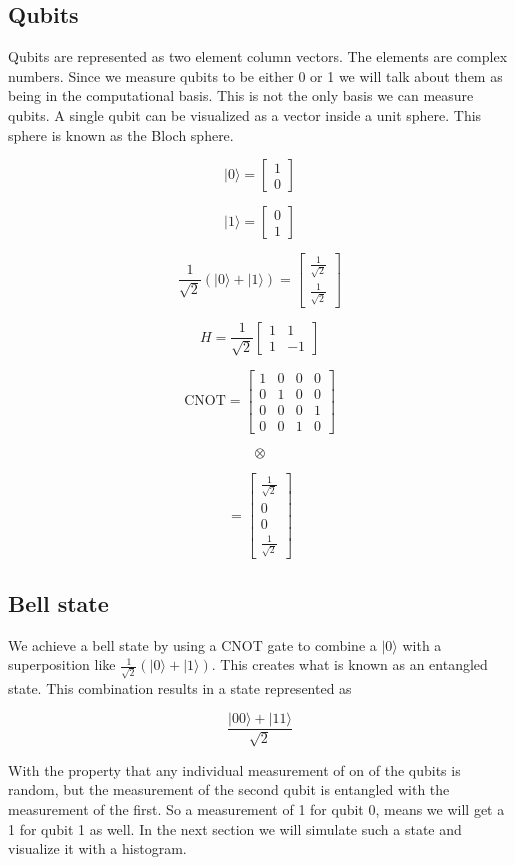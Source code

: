 \documentclass{article}
\newcommand{\ket}[1]{{\lvert #1 \rangle}}
\begin{document}
\subsection{Qubits}

Qubits are represented as two element column vectors. The elements are complex numbers. Since we measure qubits to be either 0 or 1 we will talk about them as being in the computational basis. This is not the only basis we can measure qubits. A single qubit can be visualized as a vector inside a unit sphere. This sphere is known as the Bloch sphere. 

$$
\ket{0} = 
\begin{bmatrix}
1 \\
0
\end{bmatrix}
$$

$$
\ket{1} =
\begin{bmatrix}
0 \\
1
\end{bmatrix}
$$

$$
\frac{1}{\sqrt{2}}(\ket{0}+\ket{1}) = 
\begin{bmatrix}
    \frac{1}{\sqrt{2}}\\
    \frac{1}{\sqrt{2}}
\end{bmatrix}
$$

$$
H = \frac{1}{\sqrt{2}}
\begin{bmatrix}
    1 & 1 \\
    1 & -1
\end{bmatrix}
$$

$$
\mathrm{CNOT} =
\left[\begin{matrix}1 & 0 & 0 & 0\\0 & 1 & 0 & 0\\0 & 0 & 0 & 1\\0 & 0 & 1 & 0\end{matrix}\right]
$$

$$
\otimes
$$

$$
 = 
\begin{bmatrix}
    \frac{1}{\sqrt{2}}\\
    0 \\
    0 \\
    \frac{1}{\sqrt{2}}
\end{bmatrix}
$$

\subsection{Bell state}

We achieve a bell state by using a CNOT gate to combine a $\ket{0}$ with a superposition like 
$\frac{1}{\sqrt{2}}(\ket{0}+\ket{1})$. This creates what is known as an entangled state. This combination results in a state represented as 

$$
\frac{\ket{00}+\ket{11}}{\sqrt{2}}
$$

With the property that any individual measurement of on of the qubits is random, but the measurement of the second qubit is entangled with the measurement of the first. So a measurement of 1 for qubit 0, means we will get a 1 for qubit 1 as well. In the next section we will simulate such a state and visualize it with a histogram.
\end{document}
